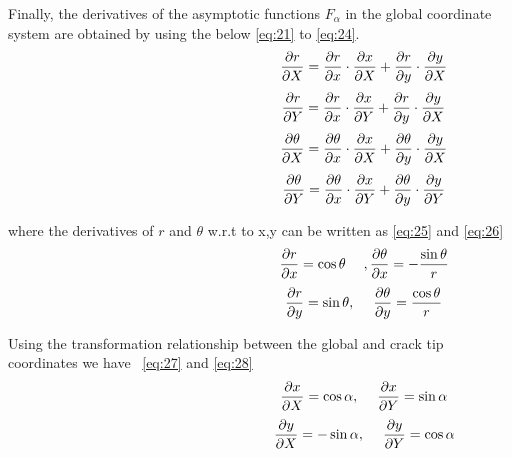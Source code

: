 \documentclass[fleqn, 12.5pt,a4paper]{report}
\newcommand\tab[1][1cm]{\hspace*{#1}}
\begin{document}
Finally, the derivatives of the asymptotic functions $F_{\alpha}$ \cite{mohammadi2008extended} in the global coordinate system are obtained by using the below \autoref{eq:21} to \autoref{eq:24}.
\begin{align}\label{eq:21}
\hspace{5.25cm}\pdv{r}{X} = \pdv{r}{x} \cdot \pdv{x}{X} + \pdv{r}{y} \cdot \pdv{y}{X}
\end{align}
\begin{align}\label{eq:22}
\hspace{5.25cm}\pdv{r}{Y} = \pdv{r}{x} \cdot \pdv{x}{Y} + \pdv{r}{y} \cdot \pdv{y}{X}
\end{align}
\begin{align}
\hspace{5.25cm}\pdv{\theta}{X} = \pdv{\theta}{x} \cdot \pdv{x}{X} + \pdv{\theta}{y} \cdot \pdv{y}{X}  
\end{align}
\begin{align}\label{eq:24}
\hspace{5.25cm}\pdv{\theta}{Y} = \pdv{\theta}{x} \cdot \pdv{x}{Y} + \pdv{\theta}{y} \cdot \pdv{y}{Y}   
\end{align}

where the derivatives of $r$ and $\theta$ w.r.t to x,y \cite{mohammadi2008extended} can be written as  \autoref{eq:25} and  \autoref{eq:26}
\begin{align}\label{eq:25}
\hspace{5.25cm}\pdv{r}{x} = \cos\theta \tab[0.45cm], \pdv{\theta}{x} = -\frac{\sin\theta}{r}
\end{align}
\begin{align}\label{eq:26}
\hspace{5.25cm}\pdv{r}{y} = \sin\theta,  \tab[0.45cm] \pdv{\theta}{y} = \frac{\cos\theta}{r}
\end{align}

\newline 
Using the transformation relationship between the global and crack tip coordinates we have ~\autoref{eq:27} and \autoref{eq:28}
\begin{align}\label{eq:27}
\hspace{5.25cm}\pdv{x}{X} = \cos\alpha,  \tab[0.45cm] \pdv{x}{Y} = \sin\alpha 
\end{align}
\begin{align}\label{eq:28}
\hspace{5.25cm}\pdv{y}{X} = -\sin\alpha, \tab[0.45cm] \pdv{y}{Y} = \cos\alpha
\end{align}
\end{document}

